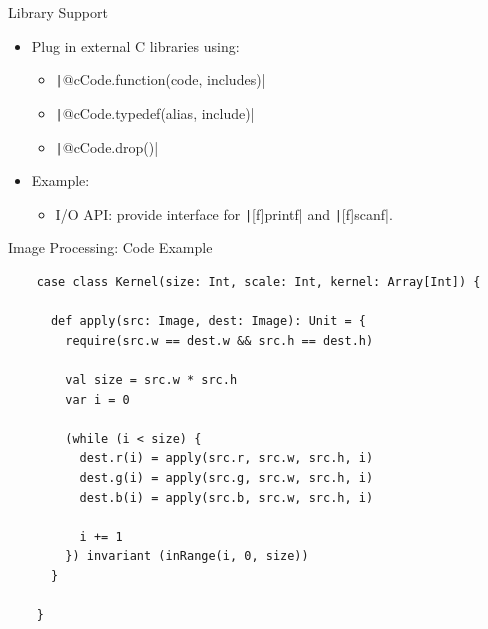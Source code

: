 \documentclass[xcolor={usenames,dvipsnames}]{beamer}
\newcommand{\InlineC}[1]{\texttt|#1|}
\newcommand{\InlineS}[1]{\texttt|#1|}
\begin{document}
\begin{frame}[fragile]{Library Support}

  \begin{itemize}

    \item Plug in external C libraries using:
      \begin{itemize}
        \item \InlineS{@cCode.function(code, includes)}
        \item \InlineS{@cCode.typedef(alias, include)}
        \item \InlineS{@cCode.drop()}
      \end{itemize}

    \item Example:
      \begin{itemize}
        \item I/O API: provide interface for \InlineC{[f]printf} and \InlineC{[f]scanf}.
      \end{itemize}

  \end{itemize}

\end{frame}


\begin{frame}[fragile]{Image Processing: Code Example}
  \begin{verbatim}
    case class Kernel(size: Int, scale: Int, kernel: Array[Int]) {

      def apply(src: Image, dest: Image): Unit = {
        require(src.w == dest.w && src.h == dest.h)

        val size = src.w * src.h
        var i = 0

        (while (i < size) {
          dest.r(i) = apply(src.r, src.w, src.h, i)
          dest.g(i) = apply(src.g, src.w, src.h, i)
          dest.b(i) = apply(src.b, src.w, src.h, i)

          i += 1
        }) invariant (inRange(i, 0, size))
      }

    }
  \end{verbatim}

\end{frame}
\end{document}
